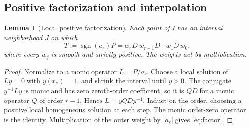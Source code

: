 \documentclass[11pt,reqno]{amsart}
\numberwithin{equation}{section}
\newtheorem{lemma}[theorem]{Lemma}
\theoremstyle{definition}
\theoremstyle{remark}
\newcommand{\sgn}{\operatorname{sgn}}
\begin{document}
\subsection{Positive factorization and interpolation}
\begin{lemma}[Local positive factorization]\label{lem:factor}
Each point of $I$ has an interval neighborhood $J$ on which
\begin{equation}\label{eq:factor}
 T:=\sgn(a_r)P=w_rD\,w_{r-1}D\cdots w_1D\,w_0,
\end{equation}
where every $w_j$ is smooth and strictly positive. The weights act by multiplication.
\end{lemma}
\begin{proof}
Normalize to a monic operator $L=P/a_r$. Choose a local solution of $Ly=0$ with $y(x_*)=1$, and shrink the interval until $y>0$. The conjugate $y^{-1}Ly$ is monic and has zero zeroth-order coefficient, so it is $QD$ for a monic operator $Q$ of order $r-1$. Hence $L=yQD y^{-1}$. Induct on the order, choosing a positive local homogeneous solution at each step. The monic order-zero operator is the identity. Multiplication of the outer weight by $|a_r|$ gives \eqref{eq:factor}.
\end{proof}
\end{document}
